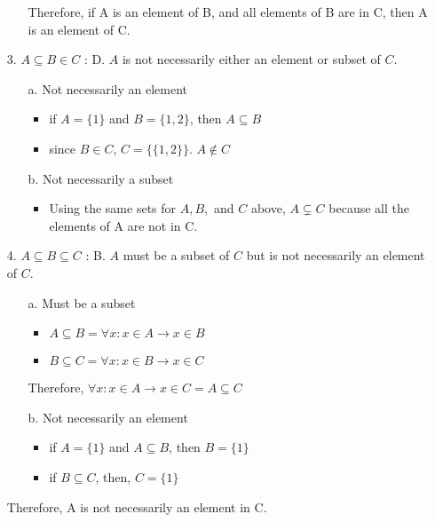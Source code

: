 \documentclass[12pt]{article}
\begin{document}
\begin{enumerate}
\begin{enumerate}
        Therefore, if A is an element of B, and all elements of B are in C, then A is an element of C.
    \end{enumerate}
  \item[3.] ${A \subseteq B \in C}$ : D. ${A}$ is not necessarily either an element or subset of ${C}$. 
    \begin{enumerate}
      \item[a.] Not necessarily an element
        \begin{itemize}
          \item if ${A = \{1\}}$ and ${B = \{1, 2\}}$, then ${A \subseteq B}$
          \item since ${B \in C}$, ${C = \{\{1, 2\}\}}$. ${A \notin C}$
        \end{itemize}
      \item[b.] Not necessarily a subset
        \begin{itemize} 
          \item Using the same sets for ${A, B,}$ and ${C}$ above, ${A \subsetneq C}$ because all the elements of A are not in C.
        \end{itemize}
    \end{enumerate}
  \item[4.] ${A \subseteq B \subseteq C}$ : B. ${A}$ must be a subset of ${C}$ but is not necessarily an element of ${C}$. 
    \begin{enumerate}
      \item[a.] Must be a subset
        \begin{itemize}
          \item ${A \subseteq B = \forall x : x \in A \rightarrow x \in B}$
          \item ${B \subseteq C = \forall x : x \in B \rightarrow x \in C}$
        \end{itemize}

        Therefore, ${\forall x : x \in A \rightarrow x \in C = A \subseteq C}$
      \item[b.] Not necessarily an element
        \begin{itemize}
          \item if ${A = \{1\}}$ and ${A \subseteq B}$, then ${B = \{1\}}$
          \item if ${B \subseteq C}$, then, ${C = \{1\}}$
        \end{itemize}
      \end{enumerate}

        Therefore, A is not necessarily an element in C.
    \end{enumerate}
\end{document}

